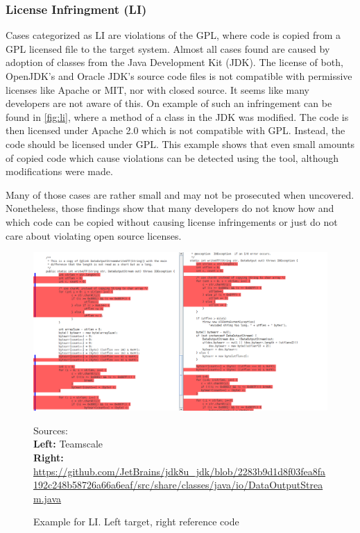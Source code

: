 \subsubsection*{License Infringment (LI)}
Cases categorized as LI are violations of the GPL, where code is copied from a GPL licensed file to the target system.
Almost all cases found are caused by adoption of classes from the Java Development Kit (JDK).
The license of both, OpenJDK's and Oracle JDK's source code files is not compatible with permissive licenses like Apache or MIT, nor with closed source.
It seems like many developers are not aware of this.
On example of such an infringement can be found in \autoref{fig:li}, where a method of a class in the JDK was modified.
The code is then licensed under Apache 2.0 which is not compatible with GPL.
Instead, the code should be licensed under GPL.
This example shows that even small amounts of copied code which cause violations can be detected using the tool, although modifications were made.

Many of those cases are rather small and may not be prosecuted when uncovered.
Nonetheless, those findings show that many developers do not know how and which code can be copied without causing license infringements or just do not care about violating open source licenses.
\begin{figure}[htpb]
	\centering
	\includegraphics[width=\linewidth]{figures/li.png}
	\caption{Example for LI. Left target, right reference code}
	{
		\begin{flushleft}
			\tiny Sources:\\
			\textbf{Left:}
			Teamscale\\
			\textbf{Right:}
			\href{https://github.com/JetBrains/jdk8u_jdk/blob/2283b9d1d8f03fea8fa192c248b58726a66a6eaf/src/share/classes/java/io/DataOutputStream.java}{https://github.com/JetBrains/jdk8u\_jdk/blob/2283b9d1d8f03fea8fa192c248b58726a66a6eaf/src/share/classes/java/io/DataOutputStream.java}
		\end{flushleft}
	}
	\label{fig:li}
\end{figure}

